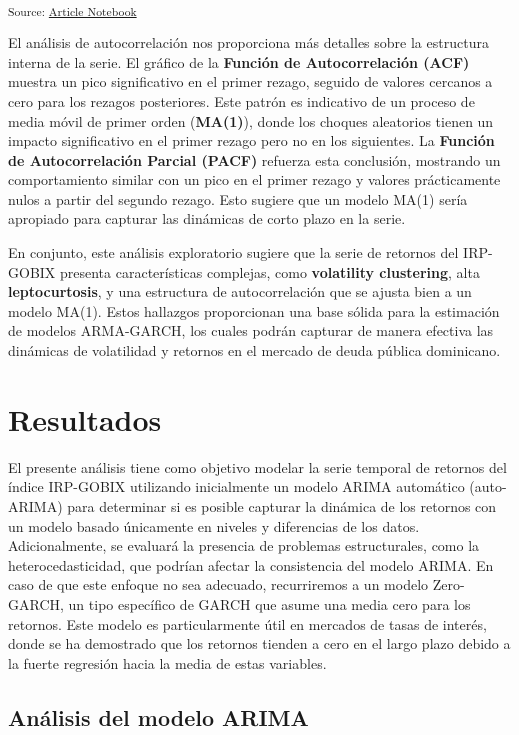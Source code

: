 \documentclass[
  number,
  preprint,
  3p,
  onecolumn]{elsarticle}
\begin{document}
\textsubscript{Source:
\href{https://iancont.github.io/fixed_income_garch/index-preview.html}{Article
Notebook}}

El análisis de autocorrelación nos proporciona más detalles sobre la
estructura interna de la serie. El gráfico de la \textbf{Función de
Autocorrelación (ACF)} muestra un pico significativo en el primer
rezago, seguido de valores cercanos a cero para los rezagos posteriores.
Este patrón es indicativo de un proceso de media móvil de primer orden
(\textbf{MA(1)}), donde los choques aleatorios tienen un impacto
significativo en el primer rezago pero no en los siguientes. La
\textbf{Función de Autocorrelación Parcial (PACF)} refuerza esta
conclusión, mostrando un comportamiento similar con un pico en el primer
rezago y valores prácticamente nulos a partir del segundo rezago. Esto
sugiere que un modelo MA(1) sería apropiado para capturar las dinámicas
de corto plazo en la serie.

En conjunto, este análisis exploratorio sugiere que la serie de retornos
del IRP-GOBIX presenta características complejas, como
\textbf{volatility clustering}, alta \textbf{leptocurtosis}, y una
estructura de autocorrelación que se ajusta bien a un modelo MA(1).
Estos hallazgos proporcionan una base sólida para la estimación de
modelos ARMA-GARCH, los cuales podrán capturar de manera efectiva las
dinámicas de volatilidad y retornos en el mercado de deuda pública
dominicano.

\section{Resultados}\label{resultados}

El presente análisis tiene como objetivo modelar la serie temporal de
retornos del índice IRP-GOBIX utilizando inicialmente un modelo ARIMA
automático (auto-ARIMA) para determinar si es posible capturar la
dinámica de los retornos con un modelo basado únicamente en niveles y
diferencias de los datos. Adicionalmente, se evaluará la presencia de
problemas estructurales, como la heterocedasticidad, que podrían afectar
la consistencia del modelo ARIMA. En caso de que este enfoque no sea
adecuado, recurriremos a un modelo Zero-GARCH, un tipo específico de
GARCH que asume una media cero para los retornos. Este modelo es
particularmente útil en mercados de tasas de interés, donde se ha
demostrado que los retornos tienden a cero en el largo plazo debido a la
fuerte regresión hacia la media de estas variables.

\subsection{Análisis del modelo
ARIMA}\label{anuxe1lisis-del-modelo-arima}
\end{document}
